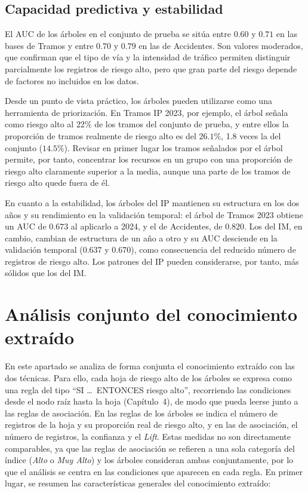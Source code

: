 \documentclass[twoside,a4paper,12pt,onecolumn,openany]{book}
\begin{document}
\subsection{Capacidad predictiva y estabilidad}
 
El AUC de los árboles en el conjunto de prueba se sitúa entre $0.60$ y $0.71$ en las bases de Tramos y entre $0.70$ y $0.79$ en las de Accidentes. Son valores moderados, que confirman que el tipo de vía y la intensidad de tráfico permiten distinguir parcialmente los registros de riesgo alto, pero que gran parte del riesgo depende de factores no incluidos en los datos.
 
\vspace{0.5cm}
 
Desde un punto de vista práctico, los árboles pueden utilizarse como una herramienta de priorización. En Tramos IP 2023, por ejemplo, el árbol señala como riesgo alto al $22\%$ de los tramos del conjunto de prueba, y entre ellos la proporción de tramos realmente de riesgo alto es del $26.1\%$, 1.8 veces la del conjunto ($14.5\%$). Revisar en primer lugar los tramos señalados por el árbol permite, por tanto, concentrar los recursos en un grupo con una proporción de riesgo alto claramente superior a la media, aunque una parte de los tramos de riesgo alto quede fuera de él.
 
\vspace{0.5cm}
 
En cuanto a la estabilidad, los árboles del IP mantienen su estructura en los dos años y su rendimiento en la validación temporal: el árbol de Tramos 2023 obtiene un AUC de $0.673$ al aplicarlo a 2024, y el de Accidentes, de $0.820$. Los del IM, en cambio, cambian de estructura de un año a otro y su AUC desciende en la validación temporal ($0.637$ y $0.670$), como consecuencia del reducido número de registros de riesgo alto. Los patrones del IP pueden considerarse, por tanto, más sólidos que los del IM.
 
\section{Análisis conjunto del conocimiento extraído}
 
En este apartado se analiza de forma conjunta el conocimiento extraído con las dos técnicas. Para ello, cada hoja de riesgo alto de los árboles se expresa como una regla del tipo ``SI \dots\ ENTONCES riesgo alto'', recorriendo las condiciones desde el nodo raíz hasta la hoja (Capítulo~4), de modo que pueda leerse junto a las reglas de asociación. En las reglas de los árboles se indica el número de registros de la hoja y su proporción real de riesgo alto, y en las de asociación, el número de registros, la confianza y el \textit{Lift}. Estas medidas no son directamente comparables, ya que las reglas de asociación se refieren a una sola categoría del índice (\textit{Alto} o \textit{Muy Alto}) y los árboles consideran ambas conjuntamente, por lo que el análisis se centra en las condiciones que aparecen en cada regla. En primer lugar, se resumen las características generales del conocimiento extraído:
 
\end{document}
